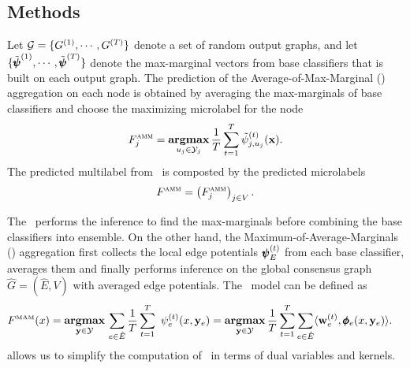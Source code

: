 {\subsection{Methods}

Let $\mathcal{G}=\{G^{(1)},\cdots,G^{(T)}\}$ denote a set of random output graphs, and let $\{\tilde{\pmb \psi}^{(1)},\cdots,\tilde{\pmb \psi}^{(T)}\}$ denote the max-marginal vectors from base classifiers that is built on each output graph.
The prediction of the Average-of-Max-Marginal (\amm) aggregation on each node is obtained by averaging the max-marginals of base classifiers and choose the maximizing microlabel for the node
\begin{align*}
	F_j^{\text{{\sc amm}}}=\underset{u_j\in\mathcal{Y}_j}{\textbf{argmax}}\,\frac{1}{T}\sum_{t=1}^{T}\tilde{\psi}_{j,u_j}^{(t)}(\mathbf {x}).	\end{align*}
The predicted multilabel from \amm\ is composted by the predicted microlabels
\begin{align*}
	F^{\text{{\sc amm}}}=\left(F_j^{\text{{\sc amm}}}\right)_{j\in V}.
\end{align*}

The \amm\ performs the inference to find the max-marginals before combining the base classifiers into ensemble. 
On the other hand, the Maximum-of-Average-Marginals (\mam) aggregation first collects the local edge potentials $\pmb \psi_E^{(t)}$ from each base classifier, averages them and finally performs inference on the global consensus graph $\hat{G}=(\hat{E},V)$ with averaged edge potentials.
The \mam\ model can be defined as
\begin{align*}
	F^{\text{\tiny MAM}}(x) &= \underset{\vy \in \Ycal }{\argmax}\,\sum_{e\in \hat{E}}\frac{1}{T}\sum_{t=1}^{T}\ \psi^{(t)}_e(x,\vy_e)
	= \underset{\vy \in \Ycal}{\argmax}\, \frac{1}{T} \sum_{t=1}^T \sum_{e\in \hat{E}} \ip{\vw_e^{(t)}}{\phib_e(x,\vy_e)}. %
\end{align*}
 allows us to simplify the computation of \mam\ in terms of dual variables and kernels.

}
